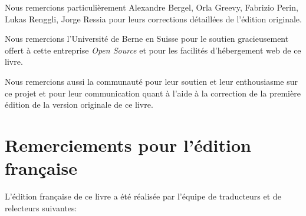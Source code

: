 \documentclass[a4paper,10pt,twoside]{book}
\begin{document}
Nous remercions particuli\`erement Alexandre Bergel, Orla Greevy,
Fabrizio Perin, Lukas Renggli, Jorge Ressia  pour leurs
corrections détaillées %
de l'édition originale. %

Nous remercions l'Universit\'e de Berne en Suisse pour le soutien
gracieusement offert \`a cette entreprise \emph{Open Source} et pour
les facilit\'es d'h\'ebergement web de ce livre.

Nous remercions aussi la communauté \squeak pour leur soutien et leur
enthousiasme sur ce projet et pour leur communication quant à l'aide à
la correction de la première édition 
de la version originale %
de ce livre. %

\section*{Remerciements pour l'\'edition fran\c{c}aise}

L'\'edition fran\c{c}aise de ce livre a \'et\'e r\'ealis\'ee par
l'\'equipe de traducteurs et de relecteurs suivantes: 


\ifx\wholebook\relax\else
   
   
\end{document}
